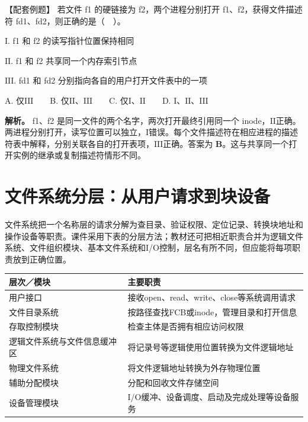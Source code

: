 \begin{example}[配套例题]

【配套例题】 若文件 f1 的硬链接为 f2，两个进程分别打开 f1、f2，获得文件描述符 fd1、fd2，则正确的是（　）。

\ensuremath{\mathrm{I}}. f1 和 f2 的读写指针位置保持相同

\ensuremath{\mathrm{II}}. f1 和 f2 共享同一个内存索引节点

\ensuremath{\mathrm{III}}. fd1 和 fd2 分别指向各自的用户打开文件表中的一项

A. 仅\ensuremath{\mathrm{III}}　　B. 仅\ensuremath{\mathrm{II}}、\ensuremath{\mathrm{III}}　　C. 仅\ensuremath{\mathrm{I}}、\ensuremath{\mathrm{II}}　　D. \ensuremath{\mathrm{I}}、\ensuremath{\mathrm{II}}、\ensuremath{\mathrm{III}}

\end{example}

\textbf{解析。} f1、f2 是同一文件的两个名字，两次打开最终引用同一个 inode，\ensuremath{\mathrm{II}}正确。两进程分别打开，读写位置可以独立，\ensuremath{\mathrm{I}}错误。每个文件描述符在相应进程的描述符表中解释，分别关联各自的打开表项，\ensuremath{\mathrm{III}}正确。答案为 \textbf{B}。这与共享同一个打开实例的继承或复制描述符情形不同。

\section{文件系统分层：从用户请求到块设备}\label{OS04-fs-layers}

文件系统把一个名称层的请求分解为查目录、验证权限、定位记录、转换块地址和操作设备等职责。课件采用下表的分层方法；教材还可把相近职责合并为逻辑文件系统、文件组织模块、基本文件系统和I/O控制，层名有所不同，但应能将每项职责放到正确位置。

\par\medskip\noindent\begin{minipage}{\linewidth}\fontsize{9.3}{12}\selectfont\begin{tabularx}{\linewidth}{@{}YY@{}}
\toprule\noalign{}
\begin{minipage}[b]{\linewidth}\raggedright
层次／模块
\end{minipage} & \begin{minipage}[b]{\linewidth}\raggedright
主要职责
\end{minipage} \\
\midrule\noalign{}


用户接口 & 接收open、read、write、close等系统调用请求 \\
文件目录系统 & 按路径查找FCB或inode，管理目录和打开信息 \\
存取控制模块 & 检查主体是否拥有相应访问权限 \\
逻辑文件系统与文件信息缓冲区 & 将记录号等逻辑使用位置转换为文件逻辑地址 \\
物理文件系统 & 将文件逻辑地址转换为外存物理位置 \\
辅助分配模块 & 分配和回收文件存储空间 \\
设备管理模块 & I/O缓冲、设备调度、启动及完成处理等设备服务 \\
\bottomrule\end{tabularx}
\end{minipage}\par\medskip


